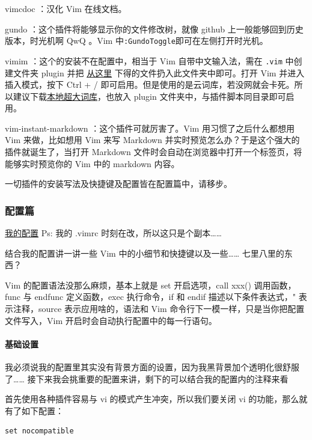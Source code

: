 vimcdoc ：汉化 Vim 在线文档。

gundo ：这个插件将能够显示你的文件修改树，就像 github 上一般能够回到历史版本，时光机啊 QwQ 。Vim 中\texttt{:GundoToggle}即可在左侧打开时光机。

vimim ：这个的安装不在配置中，相当于 Vim 自带中文输入法，需在 \texttt{.vim} 中创建文件夹 plugin 并把 \href{https://www.vim.org/scripts/download_script.php?src_id=23122}{从这里} 下得的文件扔入此文件夹中即可。打开 Vim 并进入插入模式，按下 Ctrl + / 即可启用。但是使用的是云词库，若没网就会卡死。所以建议下载\href{https://github.com/vimim/vimim/raw/master/plugin/vimim.gbk.bsddb}{本地超大词库}，也放入 plugin 文件夹中，与插件脚本同目录即可启用。

vim-instant-markdown ：这个插件可就厉害了。Vim 用习惯了之后什么都想用 Vim 来做，比如想用 Vim 来写 Markdown 并实时预览怎么办？于是这个强大的插件就诞生了，当打开 Markdown 文件时会自动在浏览器中打开一个标签页，将能够实时预览你的 Vim 中的 markdown 内容。

一切插件的安装写法及快捷键及配置皆在配置篇中，请移步。

\subsubsection{配置篇}

\href{https://github.com/LuoshuiTianyi/Vim-for-OIWiki}{我的配置} Ps: 我的 .vimrc 时刻在改，所以这只是个副本……

结合我的配置讲一讲一些 Vim 中的小细节和快捷键以及一些…… 七里八里的东西？

Vim 的配置语法没那么麻烦，基本上就是 set 开启选项，call xxx() 调用函数，func 与 endfunc 定义函数，exec 执行命令，if 和 endif 描述以下条件表达式，" 表示注释，source 表示应用啥的，语法和 Vim 命令行下一模一样，只是当你把配置文件写入，Vim 开启时会自动执行配置中的每一行语句。

\paragraph{基础设置}

我必须说我的配置里其实没有背景方面的设置，因为我黑背景加个透明化很舒服了…… 接下来我会挑重要的配置来讲，剩下的可以结合我的配置内的注释来看

首先使用各种插件容易与 vi 的模式产生冲突，所以我们要关闭 vi 的功能，那么就有了如下配置：

\begin{verbatim}
set nocompatible
\end{verbatim}

